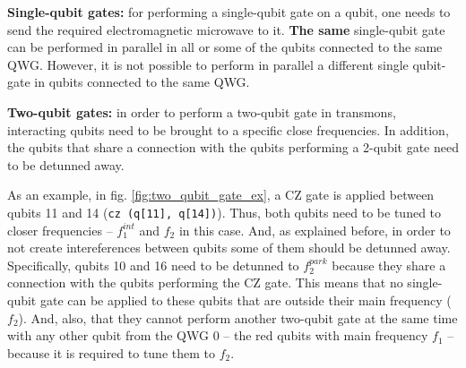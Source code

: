 

\textbf{Single-qubit gates:} for performing a single-qubit gate on a qubit, one needs to send the required electromagnetic microwave to it.  \textbf{The same} single-qubit gate can be performed in parallel in all or some of the qubits connected to the same QWG. However, it is not possible to perform in parallel a different single qubit-gate in qubits connected to the same QWG.

\textbf{Two-qubit gates:} in order to perform a two-qubit gate in transmons, interacting qubits need to be brought to a specific close frequencies. In addition, the qubits that share a connection with the qubits performing a 2-qubit gate need to be detunned away. %

As an example, in fig. \ref{fig:two_qubit_gate_ex}, a CZ gate is applied between qubits 11 and 14 (\texttt{cz (q[11], q[14])}). Thus, both qubits need to be tuned to closer frequencies -- $f_1^{int}$ and $f_2$ in this case. And, as explained before, in order to not create intereferences between qubits some of them should be detunned away. Specifically, qubits 10 and 16 need to be detunned to $f_2^{park}$ because they share a connection with the qubits performing the CZ gate. This means that no single-qubit gate can be applied to these qubits that are outside their main frequency ($f_2$). And, also, that they cannot perform another two-qubit gate at the same time with any other qubit from the QWG 0 -- the red qubits with main frequency $f_1$ -- because it is required to tune them to $f_2$.

